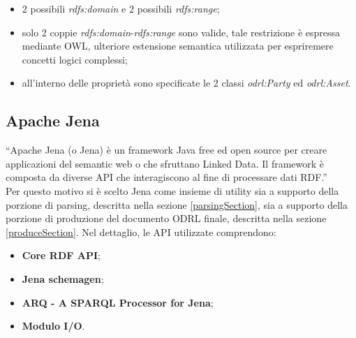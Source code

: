 \documentclass[12pt,a4paper,twoside]{book}
\begin{document}
\begin{itemize}
\item 2 possibili \textit{rdfs:domain} e 2 possibili \textit{rdfs:range};
\item solo 2 coppie \textit{rdfs:domain}-\textit{rdfs:range} sono valide, tale restrizione è espressa mediante OWL\cite{OWL}, ulteriore estensione semantica utilizzata per espriremere concetti logici complessi;
\item all'interno delle proprietà sono specificate le 2 classi \textit{odrl:Party} ed \textit{odrl:Asset}.
\end{itemize}
\subsection{Apache Jena}
``Apache Jena (o Jena) è un framework Java free ed open source per creare applicazioni del semantic web o che sfruttano Linked Data. Il framework è composta da diverse API che interagiscono al fine di processare dati RDF.''\cite{Jena}\\
Per questo motivo si è scelto Jena come insieme di utility sia a supporto della porzione di parsing, descritta nella sezione \ref{parsingSection}, sia a supporto della porzione di produzione del documento ODRL finale, descritta nella sezione \ref{produceSection}. Nel dettaglio, le API utilizzate comprendono:
\begin{itemize}
\item \textbf{Core RDF API};
\item \textbf{Jena schemagen};
\item \textbf{ARQ - A SPARQL Processor for Jena};
\item \textbf{Modulo I/O}.
\end{itemize}
\end{document}
